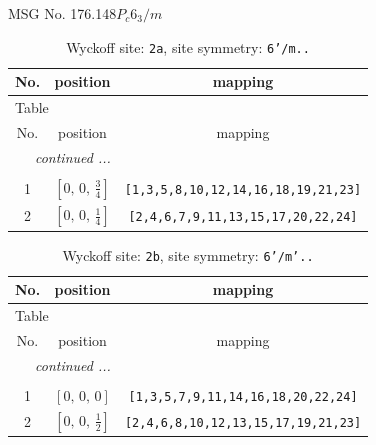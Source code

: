 \documentclass[fleqn,8pt]{jsarticle}
\begin{document}
\setcounter{MaxMatrixCols}{32}

\renewcommand{\tablename}{Table~}
\renewcommand{\figurename}{Figure~}
\begin{center}
\LARGE
MSG No. 176.148\quad$P_{c}6_{3}/m$
\end{center}
\renewcommand{\arraystretch}{1.2}
\begin{longtable}{ccc}
\caption{Wyckoff site: {\tt 2a}, site symmetry: {\tt 6'/m..}}
 \\
 \hline \hline
No. & position & mapping \\ \hline \endfirsthead

\multicolumn{2}{l}{\tablename\ \thetable{}} \\
 \hline \hline
No. & position & mapping \\ \hline \endhead

 \hline \hline
\multicolumn{2}{r}{\footnotesize\it continued ...} \\ \endfoot

 \hline \hline
\multicolumn{2}{r}{} \\ \endlastfoot

1 & $\left[ 0,\, 0,\, \frac{3}{4} \right]$ & {\tt [1,3,5,8,10,12,14,16,18,19,21,23]} \\ \hline
2 & $\left[ 0,\, 0,\, \frac{1}{4} \right]$ & {\tt [2,4,6,7,9,11,13,15,17,20,22,24]} \\
\end{longtable}
\renewcommand{\arraystretch}{1.2}
\begin{longtable}{ccc}
\caption{Wyckoff site: {\tt 2b}, site symmetry: {\tt 6'/m'..}}
 \\
 \hline \hline
No. & position & mapping \\ \hline \endfirsthead

\multicolumn{2}{l}{\tablename\ \thetable{}} \\
 \hline \hline
No. & position & mapping \\ \hline \endhead

 \hline \hline
\multicolumn{2}{r}{\footnotesize\it continued ...} \\ \endfoot

 \hline \hline
\multicolumn{2}{r}{} \\ \endlastfoot

1 & $\left[ 0,\, 0,\, 0 \right]$ & {\tt [1,3,5,7,9,11,14,16,18,20,22,24]} \\ \hline
2 & $\left[ 0,\, 0,\, \frac{1}{2} \right]$ & {\tt [2,4,6,8,10,12,13,15,17,19,21,23]} \\
\end{longtable}
\end{document}
